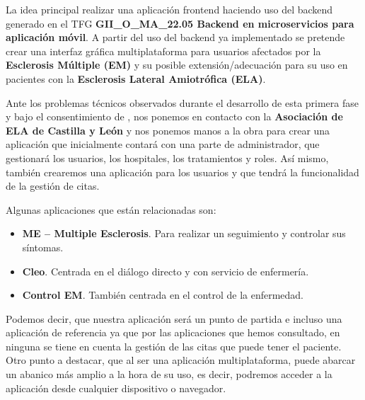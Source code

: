 
La idea principal realizar una aplicación frontend haciendo uso del backend generado en el TFG \textbf{GII\_O\_MA\_22.05 Backend en microservicios para aplicación móvil}. A partir del uso del backend ya implementado se pretende crear una interfaz gráfica multiplataforma para usuarios afectados por la \textbf{Esclerosis Múltiple (EM)} y su posible extensión/adecuación para su uso en pacientes con la \textbf{Esclerosis Lateral Amiotrófica (ELA)}.

Ante los problemas técnicos observados durante el desarrollo de esta primera fase y bajo el consentimiento de \nomtutor, nos ponemos en contacto con la \textbf{Asociación de ELA de Castilla y León} y nos ponemos manos a la obra para crear una aplicación que inicialmente contará con una parte de administrador, que gestionará los usuarios, los hospitales, los tratamientos y roles. Así mismo, también crearemos una aplicación para los usuarios y que tendrá la funcionalidad de la gestión de citas. 

Algunas aplicaciones que están relacionadas son:
\begin{itemize}
\item \textbf{ME -- Multiple Esclerosis}. Para realizar un seguimiento y controlar sus síntomas.
\item \textbf{Cleo}. Centrada en el diálogo directo y con servicio de enfermería.
\item \textbf{Control EM}. También centrada en el control de la enfermedad.
\end{itemize}

Podemos decir, que nuestra aplicación será un punto de partida e incluso una aplicación de referencia ya que por las aplicaciones que hemos consultado, en ninguna se tiene en cuenta la gestión de las citas que puede tener el paciente. Otro punto a destacar, que al ser una aplicación multiplataforma, puede abarcar un abanico más amplio a la hora de su uso, es decir, podremos acceder a la aplicación desde cualquier dispositivo o navegador.
